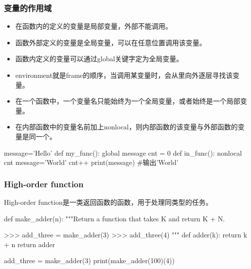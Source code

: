 \documentclass{article}
\begin{document}
      \subsubsection{变量的作用域}
        \begin{itemize}
          \item 在函数内的定义的变量是局部变量，外部不能调用。
          \item 函数外部定义的变量是全局变量，可以在任意位置调用该变量。
          \item 函数内定义的变量可以通过global关键字定为全局变量。
          \item environment就是frame的顺序，当调用某变量时，会从里向外逐层寻找该变量。
          \item 在一个函数中，一个变量名只能始终为一个全局变量，或者始终是一个局部变量。
          \item 在内部函数中的变量名前加上nonlocal，则内部函数的该变量与外部函数的变量是同一个。
        \end{itemize}

        \begin{codeblock}[language=python, caption={local and global}]
          message='Hello'
          def my_func():
            global message
            cnt = 0
            def in_func():
              nonlocal cnt
            message='World'
            cnt++
          print(message) #输出'World'
        \end{codeblock}

      \subsubsection{High-order function}
        High-order function是一类返回函数的函数，用于处理同类型的任务。
        \begin{codeblock}[language=python, caption={High-order function}]
          def make_adder(n):
            """Return a function that takes K and return K + N.

            >>> add_three = make_adder(3)
            >>> add_three(4)
            """
            def adder(k):
              return k + n
            return adder

          add_three = make_adder(3)
          print(make_adder(100)(4))
        \end{codeblock}
\end{document}
